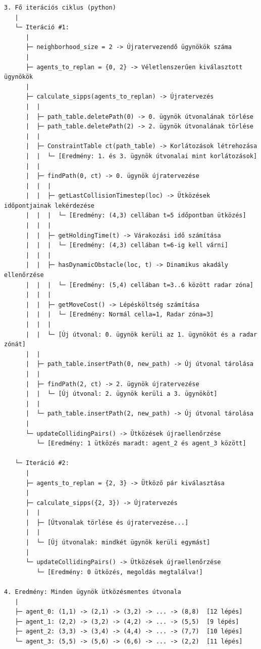 \documentclass[a4paper,12pt]{article}
\begin{document}
\begin{verbatim}
3. Fő iterációs ciklus (python)
   |
   └─ Iteráció #1:
      |
      ├─ neighborhood_size = 2 -> Újratervezendő ügynökök száma
      |
      ├─ agents_to_replan = {0, 2} -> Véletlenszerűen kiválasztott ügynökök
      |
      ├─ calculate_sipps(agents_to_replan) -> Újratervezés
      |  |
      |  ├─ path_table.deletePath(0) -> 0. ügynök útvonalának törlése
      |  ├─ path_table.deletePath(2) -> 2. ügynök útvonalának törlése
      |  |
      |  ├─ ConstraintTable ct(path_table) -> Korlátozások létrehozása
      |  |  └─ [Eredmény: 1. és 3. ügynök útvonalai mint korlátozások]
      |  |
      |  ├─ findPath(0, ct) -> 0. ügynök újratervezése
      |  |  |
      |  |  ├─ getLastCollisionTimestep(loc) -> Ütközések időpontjainak lekérdezése
      |  |  |  └─ [Eredmény: (4,3) cellában t=5 időpontban ütközés]
      |  |  |
      |  |  ├─ getHoldingTime(t) -> Várakozási idő számítása
      |  |  |  └─ [Eredmény: (4,3) cellában t=6-ig kell várni]
      |  |  |
      |  |  ├─ hasDynamicObstacle(loc, t) -> Dinamikus akadály ellenőrzése
      |  |  |  └─ [Eredmény: (5,4) cellában t=3..6 között radar zóna]
      |  |  |
      |  |  ├─ getMoveCost() -> Lépésköltség számítása
      |  |  |  └─ [Eredmény: Normál cella=1, Radar zóna=3]
      |  |  |
      |  |  └─ [Új útvonal: 0. ügynök kerüli az 1. ügynököt és a radar zónát]
      |  |
      |  ├─ path_table.insertPath(0, new_path) -> Új útvonal tárolása
      |  |
      |  ├─ findPath(2, ct) -> 2. ügynök újratervezése
      |  |  └─ [Új útvonal: 2. ügynök kerüli a 3. ügynököt]
      |  |
      |  └─ path_table.insertPath(2, new_path) -> Új útvonal tárolása
      |
      └─ updateCollidingPairs() -> Ütközések újraellenőrzése
         └─ [Eredmény: 1 ütközés maradt: agent_2 és agent_3 között]

   └─ Iteráció #2:
      |
      ├─ agents_to_replan = {2, 3} -> Ütköző pár kiválasztása
      |
      ├─ calculate_sipps({2, 3}) -> Újratervezés
      |  |
      |  ├─ [Útvonalak törlése és újratervezése...]
      |  |
      |  └─ [Új útvonalak: mindkét ügynök kerüli egymást]
      |
      └─ updateCollidingPairs() -> Ütközések újraellenőrzése
         └─ [Eredmény: 0 ütközés, megoldás megtalálva!]

4. Eredmény: Minden ügynök ütközésmentes útvonala
   |
   ├─ agent_0: (1,1) -> (2,1) -> (3,2) -> ... -> (8,8)  [12 lépés]
   ├─ agent_1: (2,2) -> (3,2) -> (4,2) -> ... -> (5,5)  [9 lépés]
   ├─ agent_2: (3,3) -> (3,4) -> (4,4) -> ... -> (7,7)  [10 lépés]
   └─ agent_3: (5,5) -> (5,6) -> (6,6) -> ... -> (2,2)  [11 lépés]
\end{verbatim}
\end{document}
